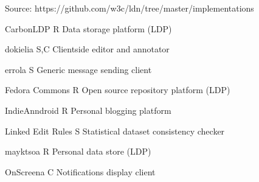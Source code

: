 \documentclass[a4paper]{llncs}
\begin{document}
                                        
\par Source: \empty https://github.com/w3c/ldn/tree/master/implementations
                                    
                                
                                
                                    
                                        \empty CarbonLDP
                                        R
                                        Data storage platform (LDP)
                                    
                                    
                                        \empty dokielia
                                        S,C
                                        Clientside editor and annotator
                                    
                                    
                                        \empty errola
                                        S
                                        Generic message sending client
                                    
                                    
                                        \empty Fedora Commons
                                        R
                                        Open source repository platform (LDP)
                                    
                                    
                                        \empty IndieAnndroid
                                        R
                                        Personal blogging platform
                                    
                                    
                                        \empty Linked Edit Rules
                                        S
                                        Statistical dataset consistency checker
                                    
                                    
                                        \empty mayktsoa
                                        R
                                        Personal data store (LDP)
                                    
                                    
                                        \empty OnScreena
                                        C
                                        Notifications display client
                                    
\end{document}
